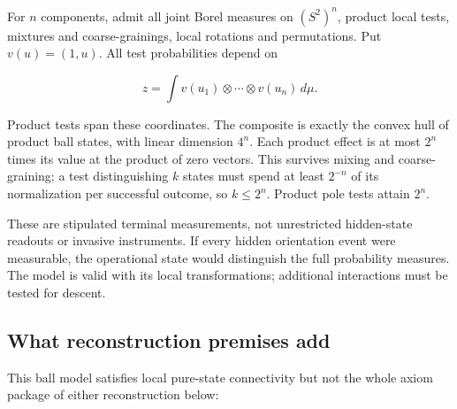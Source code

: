 \documentclass[11pt,a4paper]{article}
\begin{document}
For \(n\) components, admit all joint Borel measures on \((S^2)^n\),
product local tests, mixtures and coarse-grainings, local rotations and
permutations. Put \(v(u)=(1,u)\). All test probabilities depend on

\[z=\int v(u_1)\otimes\cdots\otimes v(u_n)\,d\mu.\]

Product tests span these coordinates. The composite is exactly the
convex hull of product ball states, with linear dimension \(4^n\). Each
product effect is at most \(2^n\) times its value at the product of zero
vectors. This survives mixing and coarse-graining; a test distinguishing
\(k\) states must spend at least \(2^{-n}\) of its normalization per
successful outcome, so \(k\le2^n\). Product pole tests attain \(2^n\).

These are stipulated terminal measurements, not unrestricted
hidden-state readouts or invasive instruments. If every hidden
orientation event were measurable, the operational state would
distinguish the full probability measures. The model is valid with its
local transformations; additional interactions must be tested for
descent.

\hypertarget{what-reconstruction-premises-add}{%
\subsection{What reconstruction premises
add}\label{what-reconstruction-premises-add}}

This ball model satisfies local pure-state connectivity but not the
whole axiom package of either reconstruction below:
\end{document}
